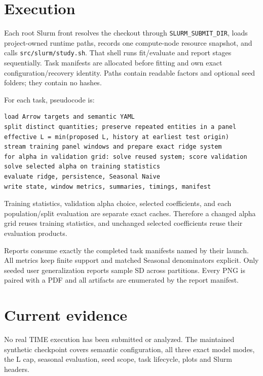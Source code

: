 \documentclass[11pt]{article}
\begin{document}
\section{Execution}
Each root Slurm front resolves the checkout through \texttt{SLURM\_SUBMIT\_DIR},
loads project-owned runtime paths, records one compute-node resource snapshot,
and calls \texttt{src/slurm/study.sh}. That shell runs fit/evaluate and report
stages sequentially. Task manifests are allocated before fitting and own exact
configuration/recovery identity. Paths contain readable factors and optional
seed folders; they contain no hashes.

For each task, pseudocode is:
\begin{verbatim}
load Arrow targets and semantic YAML
split distinct quantities; preserve repeated entities in a panel
effective L = min(proposed L, history at earliest test origin)
stream training panel windows and prepare exact ridge system
for alpha in validation grid: solve reused system; score validation
solve selected alpha on training statistics
evaluate ridge, persistence, Seasonal Naive
write state, window metrics, summaries, timings, manifest
\end{verbatim}

Training statistics, validation alpha choice, selected coefficients, and each
population/split evaluation are separate exact caches. Therefore a changed
alpha grid reuses training statistics, and unchanged selected coefficients
reuse their evaluation products.

Reports consume exactly the completed task manifests named by their launch.
All metrics keep finite support and
matched Seasonal denominators explicit. Only seeded user generalization reports
sample SD across partitions. Every PNG is paired with a PDF and all artifacts
are enumerated by the report manifest.

\section{Current evidence}
No real TIME execution has been submitted or analyzed. The maintained synthetic
checkpoint covers semantic configuration, all three exact model modes, the L
cap, seasonal evaluation, seed scope, task lifecycle, plots and Slurm headers.
\end{document}

